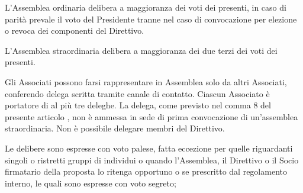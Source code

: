 \documentclass[legalpaper, 11pt]{exam}
\let\tempone\enumerate
\let\temptwo\endenumerate
\renewenvironment{enumerate}{\tempone\addtolength{\itemsep}{-0.45\baselineskip}}{\temptwo}
\begin{document}
{\begin{enumerate}
 \item L’Assemblea ordinaria delibera a maggioranza dei voti dei presenti, in caso di parità prevale il voto del Presidente tranne nel caso di convocazione per elezione o revoca dei componenti del Direttivo.
 \item L’Assemblea straordinaria delibera a maggioranza dei due terzi dei voti dei presenti.
 \item Gli Associati possono farsi rappresentare in Assemblea solo da altri Associati, conferendo delega scritta tramite canale di contatto. Ciascun Associato è portatore di al più tre deleghe. La delega, come previsto nel comma 8 del presente articolo , non è ammessa in sede di prima convocazione di un’assemblea straordinaria. Non è possibile delegare membri del Direttivo.
 \item Le delibere sono espresse con voto palese, fatta eccezione per quelle riguardanti singoli o ristretti gruppi di individui o quando l’Assemblea, il Direttivo o il Socio firmatario della proposta lo ritenga opportuno o se prescritto dal regolamento interno, le quali sono espresse con voto segreto;
\end{enumerate}

}
\end{document}

